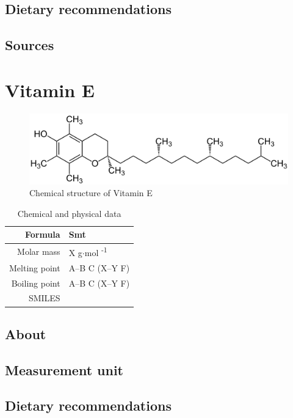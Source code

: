 \documentclass{book}
\begin{document}
\section{Dietary recommendations}


\section{Sources}


\chapter{Vitamin E}
\begin{figure}[h]
	\caption{Chemical structure of Vitamin E}
	\centering \includegraphics[width=\textwidth]{images/Vitamin_E_chemical_structure}
\end{figure}

\begin{table}[h]
	\caption{Chemical and physical data}
	\centering \begin{tabular}{| r | l |}
		\hline
		Formula & Smt\\ \hline
		Molar mass & X g$\cdot$mol \textsuperscript{-1}\\ \hline
		Melting point & A--B \degree C (X--Y \degree F)\\ \hline
		Boiling point & A--B \degree C (X--Y \degree F)\\ \hline
		SMILES & \\ \hline
	\end{tabular}
\end{table}
\newpage

\section{About}


\section{Measurement unit}


\section{Dietary recommendations}
\end{document}
